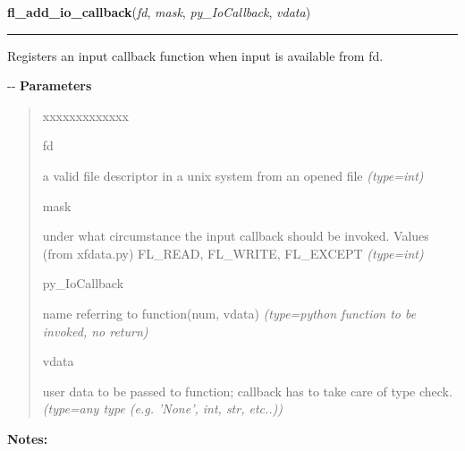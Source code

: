     \label{xformslib:flbasic:fl_add_io_callback}

    \vspace{0.5ex}

\hspace{.8\funcindent}\begin{boxedminipage}{\funcwidth}

    \raggedright \textbf{fl\_add\_io\_callback}(\textit{fd}, \textit{mask}, \textit{py\_IoCallback}, \textit{vdata})

    \vspace{-1.5ex}

    \rule{\textwidth}{0.5\fboxrule}
\setlength{\parskip}{2ex}

Registers an input callback function when input is available from fd.

-{}-
\setlength{\parskip}{1ex}
      \textbf{Parameters}
      \vspace{-1ex}

      \begin{quote}
        \begin{Ventry}{xxxxxxxxxxxxx}

          \item[fd]


a valid file descriptor in a unix system from an opened file
            {\it (type=int)}

          \item[mask]


under what circumstance the input callback should be invoked. Values
(from xfdata.py) FL\_READ, FL\_WRITE, FL\_EXCEPT
            {\it (type=int)}

          \item[py\_IoCallback]


name referring to function(num, vdata)
            {\it (type=python function to be invoked, no return)}

          \item[vdata]


user data to be passed to function; callback has to take care of
type check.
            {\it (type=any type (e.g. 'None', int, str, etc..))}

        \end{Ventry}

      \end{quote}

\textbf{Notes:}
\begin{quote}
  \begin{itemize}


\end{itemize}
\end{quote}
\end{boxedminipage}
